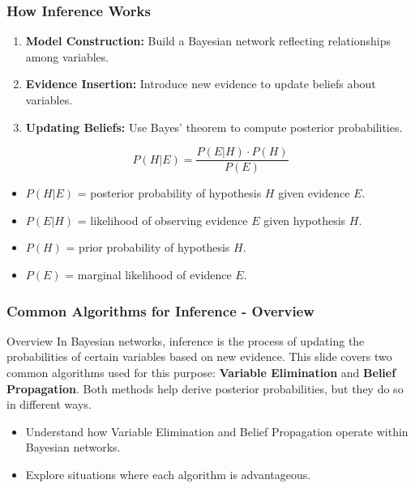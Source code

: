 \documentclass[aspectratio=169]{beamer}
\begin{document}
\begin{frame}[fragile]
    \frametitle{How Inference Works}
    \begin{enumerate}
        \item \textbf{Model Construction:} Build a Bayesian network reflecting relationships among variables.
        \item \textbf{Evidence Insertion:} Introduce new evidence to update beliefs about variables.
        \item \textbf{Updating Beliefs:} Use Bayes' theorem to compute posterior probabilities.
    \end{enumerate}

    \begin{equation}
    P(H|E) = \frac{P(E|H) \cdot P(H)}{P(E)}
    \end{equation}
    \begin{itemize}
        \item \( P(H|E) \) = posterior probability of hypothesis $H$ given evidence $E$.
        \item \( P(E|H) \) = likelihood of observing evidence $E$ given hypothesis $H$.
        \item \( P(H) \) = prior probability of hypothesis $H$.
        \item \( P(E) \) = marginal likelihood of evidence $E$.
    \end{itemize}
\end{frame}

\begin{frame}[fragile]
    \frametitle{Common Algorithms for Inference - Overview}
    \begin{block}{Overview}
        In Bayesian networks, inference is the process of updating the probabilities of certain variables based on new evidence. This slide covers two common algorithms used for this purpose: \textbf{Variable Elimination} and \textbf{Belief Propagation}. Both methods help derive posterior probabilities, but they do so in different ways.
    \end{block}

    \begin{itemize}
        \item Understand how Variable Elimination and Belief Propagation operate within Bayesian networks.
        \item Explore situations where each algorithm is advantageous.
    \end{itemize}
\end{frame}
\end{document}
